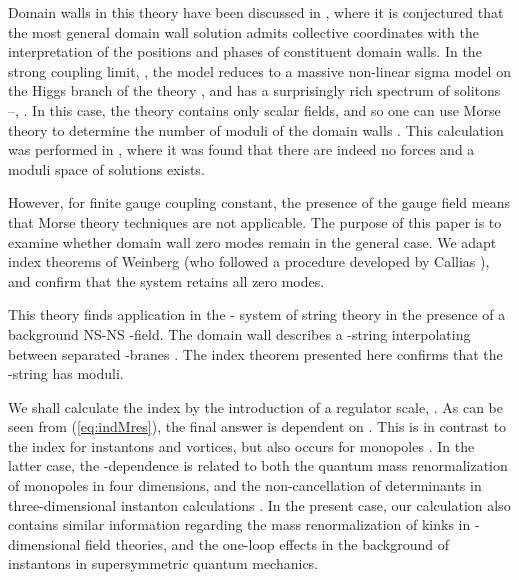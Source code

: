 \documentclass[a4paper,preprint,preprintnumbers,amsmath,amssymb]{revtex4}
\begin{document}
Domain walls in this theory have been discussed in \cite{DT02}, where it is 
conjectured that the most general domain wall solution admits \coordHE{} 
collective coordinates with the interpretation of the positions and phases 
of \coordHE{} constituent domain walls. 
In the strong coupling limit, \coordHE{}, the model reduces
to a massive non-linear sigma model on the 
Higgs branch of the theory \cite{ew93}, and has a surprisingly rich 
spectrum of solitons \cite{ea92}--\cite{NNS02}, \cite{DT02}. 
In this case, the theory contains only scalar fields,
and so one can use Morse theory to determine the number of moduli of the
domain walls \cite{ew82}. This  calculation was performed in \cite{GTT01b}, 
where it was found that there are indeed no forces and a moduli space of
solutions exists. 

However, for finite gauge coupling constant, the presence of the gauge field
means that Morse theory techniques are not applicable.
The purpose of this paper is to examine whether domain wall zero modes remain 
in the general case. 
We adapt index theorems of Weinberg (who followed a procedure developed by
Callias \cite{cjc78}), and confirm that
the system retains all \coordHE{} zero modes.

This theory finds application in the \coordHE{}-\coordHE{} system of string theory 
in the presence of a background NS-NS \coordHE{}-field. The domain wall 
describes a \coordHE{}-string interpolating between separated \coordHE{}-branes 
\cite{BT99,LT00}. 
The index theorem presented here confirms that the \coordHE{}-string has 
moduli. 

We shall calculate the index by the introduction of a regulator 
scale, \coordHE{}. As can be seen from (\ref{eq:indMres}), the final answer 
is dependent on \coordHE{}. This is in contrast to the index for instantons 
and vortices, but also occurs for monopoles \cite{ejw79}. In 
the latter case, the \coordHE{}-dependence is related to both the quantum mass 
renormalization of monopoles \cite{rkk84} in four dimensions, 
and the non-cancellation of determinants in three-dimensional 
instanton calculations \cite{DKMTV97}. In the present case, our 
calculation also contains similar information regarding the 
mass renormalization of kinks in \coordHE{}-dimensional field theories, 
and the one-loop effects in the background of instantons 
in supersymmetric quantum mechanics.
	
\end{document}
